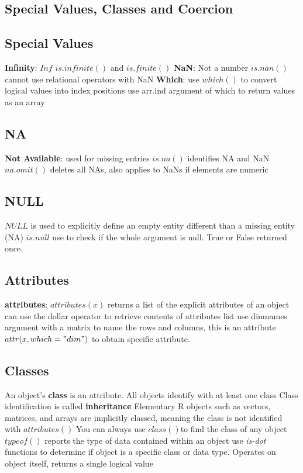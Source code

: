 \documentclass[openany]{book}
\begin{document}
\begin{flushleft}
\chapter{Special Values, Classes and Coercion}
\section{Special Values}
\textbf{Infinity}: $Inf$ \medbreak
$is.infinite()$ and $is.finite()$ \medbreak
\textbf{NaN}: Not a number \medbreak
$is.nan()$ \medbreak
cannot use relational operators with NaN \medbreak
\textbf{Which}: use $which()$ to convert logical values into index positions \medbreak
use arr.ind argument of which to return values as an array
\section{NA}
\textbf{Not Available}: used for missing entries \medbreak
$is.na()$ \medbreak
identifies NA and NaN \medbreak
$na.omit()$ deletes all NAs, also applies to NaNs if elements are numeric \medbreak
\section{NULL}
$NULL$ is used to explicitly define an empty entity different than a missing entity (NA) \medbreak
$is.null$  use to check if the whole argument is null. True or False returned once.
\section{Attributes}
\textbf{attributes}: $attributes(x)$ returns a list of the explicit attributes of an object \medbreak
can use the dollar operator to retrieve contents of attributes list \medbreak
use dimnames argument with a matrix to name the rows and columns, this is an attribute \medbreak
$attr(x,which="dim")$ to obtain specific attribute.
\section{Classes}
An object's \textbf{class} is an attribute. All objects identify with at least one class \medbreak
Class identification is called \textbf{inheritance} \medbreak
Elementary R objects such as vectors, matrices, and arrays are implicitly classed, meaning the class is not identified with $attributes()$ \medbreak
You can always use $class()$to find the class of any object \medbreak
$typeof()$ reports the type of data contained within an object \medbreak
use \textit{is-dot} functions to determine if object is a specific class or data type. Operates on object itself, returns a single logical value

\end{flushleft}
\end{document}
